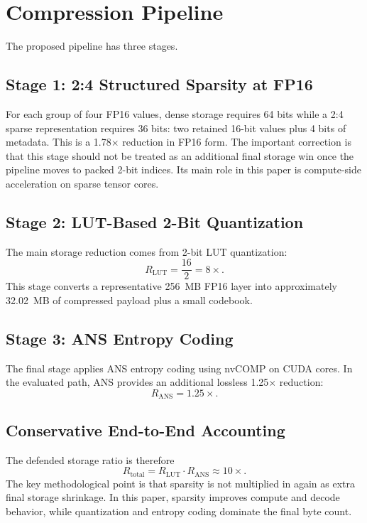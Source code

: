 \documentclass[11pt]{article}
\begin{document}
\section{Compression Pipeline}
The proposed pipeline has three stages.

\subsection{Stage 1: 2:4 Structured Sparsity at FP16}
For each group of four FP16 values, dense storage requires 64 bits while a 2:4 sparse representation requires 36 bits: two retained 16-bit values plus 4 bits of metadata. This is a 1.78$\times$ reduction in FP16 form. The important correction is that this stage should not be treated as an additional final storage win once the pipeline moves to packed 2-bit indices. Its main role in this paper is compute-side acceleration on sparse tensor cores.

\subsection{Stage 2: LUT-Based 2-Bit Quantization}
The main storage reduction comes from 2-bit LUT quantization:
\begin{equation}
R_{\text{LUT}} = \frac{16}{2} = 8\times.
\end{equation}
This stage converts a representative 256~MB FP16 layer into approximately 32.02~MB of compressed payload plus a small codebook.

\subsection{Stage 3: ANS Entropy Coding}
The final stage applies ANS entropy coding using nvCOMP on CUDA cores. In the evaluated path, ANS provides an additional lossless 1.25$\times$ reduction:
\begin{equation}
R_{\text{ANS}} = 1.25\times.
\end{equation}

\subsection{Conservative End-to-End Accounting}
The defended storage ratio is therefore
\begin{equation}
R_{\text{total}} = R_{\text{LUT}} \cdot R_{\text{ANS}} \approx 10\times.
\end{equation}
The key methodological point is that sparsity is not multiplied in again as extra final storage shrinkage. In this paper, sparsity improves compute and decode behavior, while quantization and entropy coding dominate the final byte count.
\end{document}
